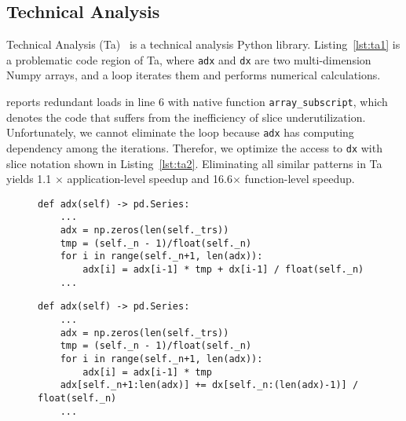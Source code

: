 \subsection{Technical Analysis} Technical Analysis (Ta)~\cite{ta} is a technical analysis Python library. Listing~\ref{lst:ta1} is a problematic code region of Ta, where {\tt adx} and {\tt dx} are two multi-dimension Numpy arrays, and a loop iterates them and performs numerical calculations. 

\tool reports redundant loads in line 6 with native function {\tt array\_subscript}, which denotes the code that suffers from the inefficiency of slice underutilization. Unfortunately, we cannot eliminate the loop because {\tt adx} has computing dependency among the iterations. Therefor, we optimize the access to {\tt dx} with slice notation shown in Listing~\ref{lst:ta2}. Eliminating all similar patterns in Ta yields 1.1 $\times$ application-level speedup and 16.6$\times$ function-level speedup.


\begin{figure}[t]
\begin{lstlisting}[caption={Interaction inefficiency in Ta due to slice underutilization.},label=lst:ta1]
def adx(self) -> pd.Series:
    ...
    adx = np.zeros(len(self._trs))
    tmp = (self._n - 1)/float(self._n)
    for i in range(self._n+1, len(adx)):
        adx[i] = adx[i-1] * tmp + dx[i-1] / float(self._n)
    ...
\end{lstlisting}
\end{figure}


\begin{figure}[t]
\begin{lstlisting}[caption={Optimized code of Listing~\ref{lst:ta1}, eliminates inefficiencies by performing slice notation.},label=lst:ta2]
def adx(self) -> pd.Series:
    ...
    adx = np.zeros(len(self._trs))
    tmp = (self._n - 1)/float(self._n)
    for i in range(self._n+1, len(adx)):
        adx[i] = adx[i-1] * tmp
    adx[self._n+1:len(adx)] += dx[self._n:(len(adx)-1)] / float(self._n)
    ...
\end{lstlisting}
\end{figure}



